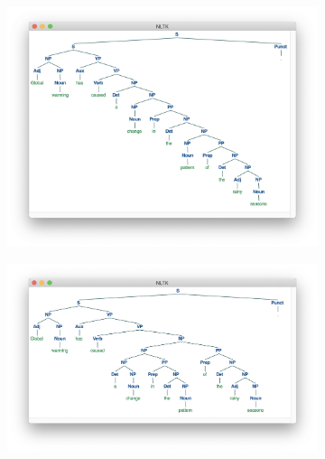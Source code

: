 \documentclass[11pt]{article} %
\begin{document}
\begin{figure}[p]
  \begin{subfigure}{0.45\textwidth}
    \includegraphics[width=0.9\linewidth]{images/figure_cfg_tree_3.png}
    \caption{}
    \label{fig2:golden}
  \end{subfigure}
  \begin{subfigure}{0.45\textwidth}
    \includegraphics[width=0.9\linewidth]{images/figure_cfg_tree_4.png}
    \caption{}
    \label{fig2:doublepponchange}
  \end{subfigure}
  

\end{figure}
\end{document}
